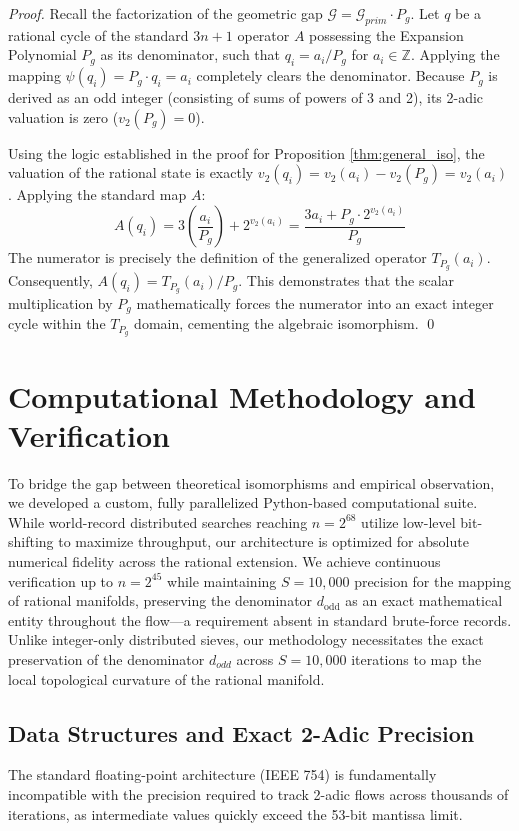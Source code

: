 \documentclass[11pt, a4paper]{article}
\theoremstyle{definition}
\begin{document}
\begin{proof}
Recall the factorization of the geometric gap $\mathcal{G} = \mathcal{G}_{prim} \cdot P_g$. Let $q$ be a rational cycle of the standard $3n+1$ operator $A$ possessing the Expansion Polynomial $P_g$ as its denominator, such that $q_i = a_i / P_g$ for $a_i \in \mathbb{Z}$. Applying the mapping \(\psi(q_i) = P_g \cdot q_i = a_i\) completely clears the denominator. Because $P_g$ is derived as an odd integer (consisting of sums of powers of 3 and 2), its 2-adic valuation is zero ($v_2(P_g) = 0$).

Using the logic established in the proof for Proposition \ref{thm:general_iso}, the valuation of the rational state is exactly $v_2(q_i) = v_2(a_i) - v_2(P_g) = v_2(a_i)$. Applying the standard map $A$:
\begin{equation*}
A(q_i) = 3\left(\frac{a_i}{P_g}\right) + 2^{v_2(a_i)} = \frac{3a_i + P_g \cdot 2^{v_2(a_i)}}{P_g}
\end{equation*}
The numerator is precisely the definition of the generalized operator $T_{P_g}(a_i)$. Consequently, $A(q_i) = T_{P_g}(a_i) / P_g$. This demonstrates that the scalar multiplication by $P_g$ mathematically forces the numerator into an exact integer cycle within the $T_{P_g}$ domain, cementing the algebraic isomorphism. \qed
\end{proof}

\section{Computational Methodology and Verification}

To bridge the gap between theoretical isomorphisms and empirical observation, we developed a custom, fully parallelized Python-based computational suite. While world-record distributed searches reaching $n=2^{68}$ utilize low-level bit-shifting to maximize throughput, our architecture is optimized for absolute numerical fidelity across the rational extension. We achieve continuous verification up to $n=2^{45}$ while maintaining $S=10,000$ precision for the mapping of rational manifolds, preserving the denominator $d_{\text{odd}}$ as an exact mathematical entity throughout the flow---a requirement absent in standard brute-force records. Unlike integer-only distributed sieves, our methodology necessitates the exact preservation of the denominator $d_{odd}$ across $S=10,000$ iterations to map the local topological curvature of the rational manifold.

\subsection{Data Structures and Exact 2-Adic Precision}
The standard floating-point architecture (IEEE 754) is fundamentally incompatible with the precision required to track 2-adic flows across thousands of iterations, as intermediate values quickly exceed the 53-bit mantissa limit.
\end{document}
